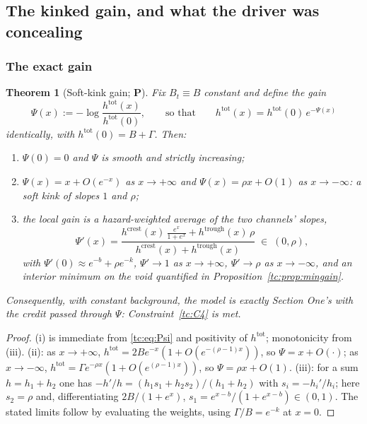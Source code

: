 \documentclass[11pt]{article}
\numberwithin{equation}{section}
\theoremstyle{plain}
\newtheorem{theorem}{Theorem}[section]
\theoremstyle{definition}
\theoremstyle{remark}
\begin{document}
\subsection{The kinked gain, and what the driver was concealing}
\label{tc:sub:gain}

\subsubsection{The exact gain}\label{tc:subsub:gain}

\begin{theorem}[Soft-kink gain; \textbf{P}]\label{tc:thm:gain}
Fix $B_t\equiv B$ constant and define the \emph{gain}
\begin{equation}\label{tc:eq:Psi}
\Psi(x):=-\log\frac{h^{\mathrm{tot}}(x)}{h^{\mathrm{tot}}(0)},
\qquad\text{so that}\qquad
h^{\mathrm{tot}}(x)=h^{\mathrm{tot}}(0)\,e^{-\Psi(x)}
\end{equation}
identically, with $h^{\mathrm{tot}}(0)=B+\Gamma$. Then:
\begin{enumerate}[label=\emph{(\roman*)},itemsep=1pt]
\item $\Psi(0)=0$ and $\Psi$ is smooth and strictly increasing;
\item $\Psi(x)=x+O(e^{-x})$ as $x\to+\infty$ and
$\Psi(x)=\rho x+O(1)$ as $x\to-\infty$: a \emph{soft kink} of slopes
$1$ and $\rho$;
\item the local gain is a hazard-weighted average of the two channels'
slopes,
\begin{equation}\label{tc:eq:Psiprime}
\Psi'(x)=\frac{h^{\mathrm{crest}}(x)\,\frac{e^{x}}{1+e^{x}}
+h^{\mathrm{trough}}(x)\,\rho}
{h^{\mathrm{crest}}(x)+h^{\mathrm{trough}}(x)}\;\in\;(0,\rho),
\end{equation}
with $\Psi'(0)\approx e^{-b}+\rho e^{-k}$, $\Psi'\to1$ as
$x\to+\infty$, $\Psi'\to\rho$ as $x\to-\infty$, and an interior minimum
on the void quantified in Proposition~\ref{tc:prop:mingain}.
\end{enumerate}
Consequently, with constant background, the model is exactly Section
One's with the credit passed through $\Psi$: Constraint~\ref{tc:C4} is
met.
\end{theorem}

\begin{proof}
(i) is immediate from \eqref{tc:eq:Psi} and positivity of
$h^{\mathrm{tot}}$; monotonicity from (iii). (ii): as $x\to+\infty$,
$h^{\mathrm{tot}}=2Be^{-x}(1+O(e^{-(\rho-1)x}))$, so $\Psi=x+O(\cdot)$;
as $x\to-\infty$, $h^{\mathrm{tot}}=\Gamma e^{-\rho x}(1+O(e^{(\rho-1)
x}))$, so $\Psi=\rho x+O(1)$. (iii): for a sum $h=h_1+h_2$ one has
$-h'/h=(h_1s_1+h_2s_2)/(h_1+h_2)$ with $s_i=-h_i'/h_i$; here
$s_2=\rho$ and, differentiating $2B/(1+e^{x})$,
$s_1=e^{x-b}/(1+e^{x-b})\in(0,1)$. The stated limits follow by
evaluating the weights, using $\Gamma/B=e^{-k}$ at $x=0$.
\end{proof}
\end{document}
